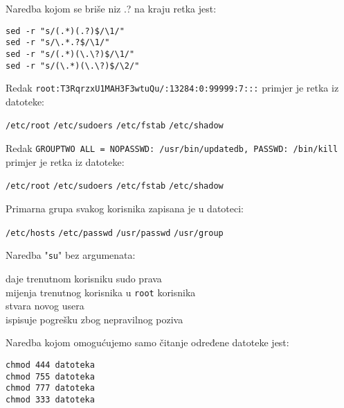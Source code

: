 \documentclass[a4paper,11pt]{exam}
\newcommand{\shell}[1]{\texttt{#1}}
\begin{document}
\begin{questions}
  \question
  Naredba kojom se briše niz .? na kraju retka jest: 

		\begin{oneparchoices}
		\choice \verb|sed -r "s/(.*)(.?)$/\1/"|  \\
		\choice \verb|sed -r "s/\.*.?$/\1/"| \\
    \CorrectChoice \verb|sed -r "s/(.*)(\.\?)$/\1/"| \\ 
    \choice \verb|sed -r "s/(\.*)(\.\?)$/\2/"|
	\end{oneparchoices}

	
		\question
	Redak \shell{root:T3RqrzxU1MAH3F3wtuQu/:13284:0:99999:7:::} primjer je retka iz datoteke:
	
	\begin{oneparchoices}
		\choice \shell{/etc/root} 
		\choice \shell{/etc/sudoers} 
		\choice \shell{/etc/fstab} 
		\CorrectChoice \shell{/etc/shadow}
  \end{oneparchoices}

		\question
	Redak \shell{GROUPTWO    ALL = NOPASSWD: /usr/bin/updatedb, PASSWD: /bin/kill} primjer je retka iz datoteke:
	
	\begin{oneparchoices}
		\choice \shell{/etc/root} 
		\CorrectChoice \shell{/etc/sudoers} 
		\choice \shell{/etc/fstab} 
		\choice \shell{/etc/shadow}
  \end{oneparchoices}


	\question
	Primarna grupa svakog korisnika zapisana je u datoteci:

	\begin{oneparchoices}
   	\choice \shell{/etc/hosts}
		\CorrectChoice \shell{/etc/passwd}
		\choice \shell{/usr/passwd} 
		\choice \shell{/usr/group}  
	\end{oneparchoices}

	\question
  Naredba "\shell{su}" bez argumenata:
	
	\begin{oneparchoices}
		\choice daje trenutnom korisniku sudo prava \\
		\CorrectChoice mijenja trenutnog korisnika u \shell{root} korisnika \\ 
		\choice stvara novog usera \\
		\choice ispisuje pogrešku zbog nepravilnog poziva
	\end{oneparchoices}
	
	\question
  Naredba kojom omogućujemo samo čitanje određene datoteke jest: 

	\begin{oneparchoices}
		\CorrectChoice \shell{chmod 444 datoteka}\\ 
		\choice \shell{chmod 755 datoteka} \\
		\choice \shell{chmod 777 datoteka} \\
		\choice \shell{chmod 333 datoteka}
	\end{oneparchoices}
	

\end{questions}
\end{document}
